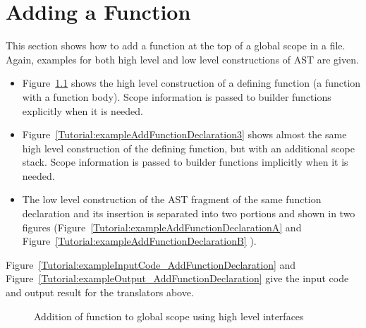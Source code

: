 \chapter{Adding a Function}
This section shows how to add a function at the top of a global scope in a
file. Again, examples for both high level and low level constructions of AST are given.
\begin{itemize}
\item Figure~\ref{Tutorial:exampleAddFunctionDeclaration2} shows the high
level construction of a defining function (a function  with a function
    body). Scope information is passed to builder functions explicitly when
it is needed.
\item Figure~\ref{Tutorial:exampleAddFunctionDeclaration3} shows almost the
same high level construction of the defining function, but with an
additional scope stack. 
 Scope information is passed to builder functions implicitly when
it is needed.

\item  The low level construction of the AST fragment of the same function 
declaration and its insertion 
is separated into two portions and shown in two figures 
(Figure~\ref{Tutorial:exampleAddFunctionDeclarationA} and
Figure~\ref{Tutorial:exampleAddFunctionDeclarationB} ).

\end{itemize}

Figure~\ref{Tutorial:exampleInputCode_AddFunctionDeclaration} and 
Figure~\ref{Tutorial:exampleOutput_AddFunctionDeclaration} 
give the input code and output result for the
translators above.
\begin{figure}[!h]
{\indent
{\mySmallestFontSize
\begin{latexonly}
  
\end{latexonly}

\begin{htmlonly}
   
\end{htmlonly}

}
}
\caption{Addition of function to global scope using high level interfaces}
\label{Tutorial:exampleAddFunctionDeclaration2}
\end{figure}

